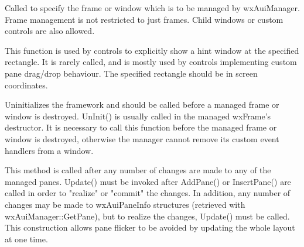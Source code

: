 Called to specify the frame or window which is to be managed by wxAuiManager.  Frame management is not restricted to just frames.  Child windows or custom controls are also allowed.

\label{wxauimanagershowhint}


This function is used by controls to explicitly show a hint window at the specified rectangle.  It is rarely called, and is mostly used by controls implementing custom pane drag/drop behaviour.  The specified rectangle should be in screen coordinates.

\label{wxauimanageruninit}


Uninitializes the framework and should be called before a managed frame or window is destroyed. UnInit() is usually called in the managed wxFrame's destructor.  It is necessary to call this function before the managed frame or window is destroyed, otherwise the manager cannot remove its custom event handlers from a window.

\label{wxauimanagerupdate}


This method is called after any number of changes are
made to any of the managed panes. Update() must be invoked after
AddPane() or InsertPane() are called in order to "realize" or "commit"
the changes. In addition, any number of changes may be made to
wxAuiPaneInfo structures (retrieved with wxAuiManager::GetPane), but to
realize the changes, Update() must be called. This construction allows
pane flicker to be avoided by updating the whole layout at one time.

